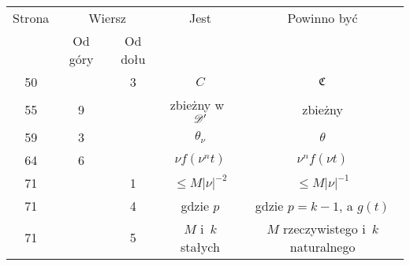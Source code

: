 \documentclass[a4paper,11pt]{article}
\begin{document}
\begin{center}
  \begin{tabular}{|c|c|c|c|c|}
    \hline
    Strona & \multicolumn{2}{c|}{Wiersz} & Jest
                              & Powinno być \\ \cline{2-3}
    & Od góry & Od dołu & & \\
    \hline
    50  & & \hphantom{0}3 & $C$ & $\mathfrak{C}$ \\
    55  & \hphantom{0}9 & & zbieżny w~$\mathcal{D}'$ & zbieżny \\
    59  & \hphantom{0}3 & & $\theta_{ \nu }$ & $\theta$ \\
    64  & \hphantom{0}6 & & $\nu f( \nu^{ n } t )$ & $\nu^{ n } f( \nu t )$ \\
    71 & & \hphantom{0}1 & $\leq M | \nu |^{ -2 }$ & $\leq M | \nu |^{ -1 }$ \\
    71 & & \hphantom{0}4 & gdzie $p$ & gdzie $p = k - 1$, a $g( t )$ \\
    71 & & \hphantom{0}5 & $M$ i~$k$ stałych
    & $M$ rzeczywistego i~$k$ naturalnego \\
    \hline
  \end{tabular}

\end{center}

\VerSpaceSix
\end{document}
